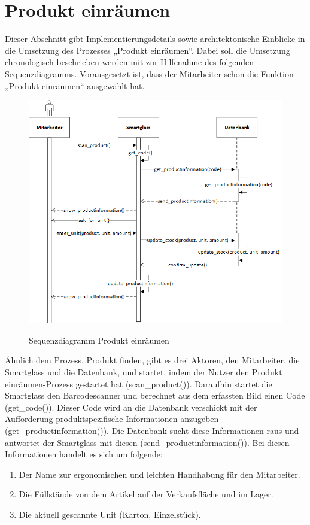 \section{Produkt einräumen}
Dieser Abschnitt gibt Implementierungsdetails sowie architektonische Einblicke in die Umsetzung des Prozesses „Produkt einräumen“. Dabei soll die Umsetzung chronologisch beschrieben werden mit zur Hilfenahme des folgenden Sequenzdiagramms. Vorausgesetzt ist, dass der Mitarbeiter schon die Funktion „Produkt einräumen“ ausgewählt hat. 
\begin{figure}[H]
	\centering
	{\includegraphics[scale=0.7]{Bilder/Abbildungen/SMAR_produkt_einraeumen_Sequenzdiagramm.png}}
	\caption{Sequenzdiagramm Produkt einräumen}
	\label{fig:jwt_encode}
\end{figure}
Ähnlich dem Prozess, Produkt finden, gibt es drei Aktoren, den Mitarbeiter, die Smartglass und die Datenbank, und startet, indem der Nutzer den \glqq Produkt einräumen\grqq -Prozess gestartet hat (scan\_product()). Daraufhin startet die Smartglass den Barcodescanner und berechnet aus dem erfassten Bild einen Code (get\_code()). Dieser Code wird an die Datenbank verschickt mit der Aufforderung produktspezifische Informationen anzugeben (get\_productinformation()). Die Datenbank sucht diese Informationen raus und antwortet der Smartglass mit diesen (send\_productinformation()). Bei diesen Informationen handelt es sich um folgende: 
\begin{enumerate}
	\item Der Name zur ergonomischen und leichten Handhabung für den Mitarbeiter.
	\item Die Füllstände von dem Artikel auf der Verkaufsfläche und im  Lager.
	\item Die aktuell gescannte Unit (Karton, Einzelstück).
\end{enumerate}
